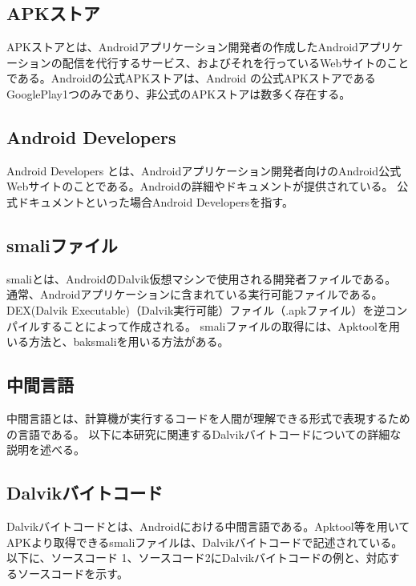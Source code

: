 \subsection{APKストア}
APKストアとは、Androidアプリケーション開発者の作成したAndroidアプリケーションの配信を代行するサービス、およびそれを行っているWebサイトのことである。Androidの公式APKストアは、Android の公式APKストアであるGooglePlay\cite{GooglePlay}1つのみであり、非公式のAPKストアは数多く存在する。


\subsection{Android Developers}
Android Developers とは、Androidアプリケーション開発者向けのAndroid公式Webサイトのことである\cite{Android_Developers}。Androidの詳細やドキュメントが提供されている。
公式ドキュメントといった場合Android Developersを指す。


\subsection{smaliファイル}
smaliとは、AndroidのDalvik仮想マシンで使用される開発者ファイルである。
通常、Androidアプリケーションに含まれている実行可能ファイルである。
DEX(Dalvik Executable)（Dalvik実行可能）ファイル（.apkファイル）を逆コンパイルすることによって作成される。
smaliファイルの取得には、Apktool\cite{Apktool}を用いる方法と、baksmali\cite{Baksmali}を用いる方法がある。


\subsection{中間言語}
中間言語とは、計算機が実行するコードを人間が理解できる形式で表現するための言語である。
以下に本研究に関連するDalvikバイトコードについての詳細な説明を述べる。


\subsection{Dalvikバイトコード}
Dalvikバイトコードとは、Androidにおける中間言語である。Apktool等を用いてAPKより取得できるsmaliファイルは、Dalvikバイトコードで記述されている。以下に、ソースコード 1、ソースコード2にDalvikバイトコードの例と、対応するソースコードを示す。

